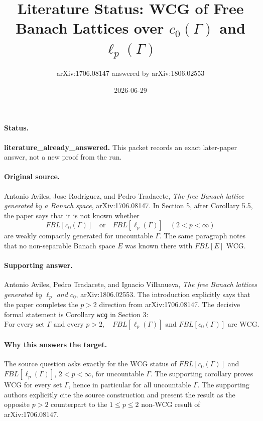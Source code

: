 \documentclass[11pt]{article}
\title{Literature Status: WCG of Free Banach Lattices over \(c_0(\Gamma)\) and \(\ell_p(\Gamma)\)}
\author{arXiv:1706.08147 answered by arXiv:1806.02553}
\date{2026-06-29}
\begin{document}
\maketitle

\paragraph{Status.}
\textbf{literature\_already\_answered.}  This packet records an exact later-paper answer, not a new proof from the run.

\paragraph{Original source.}
Antonio Aviles, Jose Rodriguez, and Pedro Tradacete, \emph{The free Banach lattice generated by a Banach space}, arXiv:1706.08147.
In Section 5, after Corollary 5.5, the paper says that it is not known whether
\[
  FBL[c_0(\Gamma)]
  \quad\text{or}\quad
  FBL[\ell_p(\Gamma)]\quad (2<p<\infty)
\]
are weakly compactly generated for uncountable \(\Gamma\).  The same paragraph notes that no non-separable Banach space \(E\) was known there with \(FBL[E]\) WCG.

\paragraph{Supporting answer.}
Antonio Aviles, Pedro Tradacete, and Ignacio Villanueva, \emph{The free Banach lattices generated by \(\ell_p\) and \(c_0\)}, arXiv:1806.02553.
The introduction explicitly says that the paper completes the \(p>2\) direction from arXiv:1706.08147.  The decisive formal statement is Corollary \texttt{wcg} in Section 3:
\[
  \text{For every set }\Gamma\text{ and every }p>2,\quad
  FBL[\ell_p(\Gamma)]\text{ and }FBL[c_0(\Gamma)]\text{ are WCG.}
\]

\paragraph{Why this answers the target.}
The source question asks exactly for the WCG status of \(FBL[c_0(\Gamma)]\) and \(FBL[\ell_p(\Gamma)]\), \(2<p<\infty\), for uncountable \(\Gamma\).  The supporting corollary proves WCG for every set \(\Gamma\), hence in particular for all uncountable \(\Gamma\).  The supporting authors explicitly cite the source construction and present the result as the opposite \(p>2\) counterpart to the \(1\le p\le2\) non-WCG result of arXiv:1706.08147.
\end{document}
